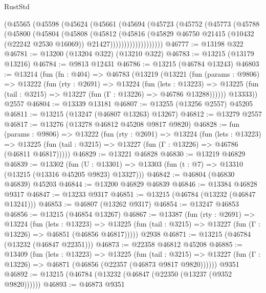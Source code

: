 \begin{lexlean}{RustStd}
\begin{coremodule}
            (@45565
              (@45598
                (@45624
                  (@45661
                    (@45694
                      (@45723
                        (@45752
                          (@45773
                            (@45788
                              (@45800
                                (@45804
                                  (@45808
                                    (@45812
                                      (@45816
                                        (@45829
                                          @46750
                                          @21415
                                          (@10432 (@22242 @2530 @16069))
                                          @21427)))))))))))))))))))
@46777 := @13198 @322
@46781 := @13200 (@13204 @322) (@13210 @322)
@46783 := @13215 (@13179 @13216)
@46784 := @9813 @12431
@46786 := @13215 (@46784 @13243)
@46803 := @13214
    (fun (fn : @404) =>
    @46783
      (@13219
        (@13221
          (fun (params : @9806) =>
          @13222
            (fun (rty : @2691) =>
            @13224
              (fun (lets : @13223) =>
              @13225 (fun (tail : @3215) => @13227 (fun (Γ : @13226) => @46786 @13288))))))
        @13333))
    @2557
@46804 := @13339 @13181
@46807 := @13255 (@13256 @2557) @45205
@46811 := @13215 (@13247 (@46807 @13263) @13267)
@46812 := @13279 @2557
@46817 := @13276 (@13278 @46812 @45208 @9817 @9820)
@46828 := fun (params : @9806) =>
  @13222
    (fun (rty : @2691) =>
    @13224
      (fun (lets : @13223) =>
      @13225 (fun (tail : @3215) => @13227 (fun (Γ : @13226) => @46786 (@46811 @46817)))))
@46829 := @13221 @46828
@46830 := @13219 @46829
@46839 := @13302
    (fun (U : @13301) => @13303 (fun (t : @7) => @13310 (@13215 (@13316 @45205 @9823) @13327)))
@46842 := @46804 (@46830 @46839) @45203
@46844 := @13200 @46829 @46839
@46846 := @13384 @46828 @9317
@46847 := @13233 @9317
@46851 := @13215 (@46784 (@13232 (@46847 @13241)))
@46853 := @46807 (@13262 @9317)
@46854 := @13247 @46853
@46856 := @13215 (@46854 @13267)
@46867 := @13387
    (fun (rty : @2691) =>
    @13224
      (fun (lets : @13223) =>
      @13225 (fun (tail : @3215) => @13227 (fun (Γ : @13226) => @46851 (@46856 @46817)))))
    @2938
@46871 := @13215 (@46784 (@13232 (@46847 @22351)))
@46873 := @22358 @46812 @45208
@46885 := @13409
    (fun (lets : @13223) =>
    @13225
      (fun (tail : @3215) =>
      @13227 (fun (Γ : @13226) => @46871 (@46856 (@22357 (@46873 @9817 @9820))))))
    @9351
@46892 := @13215 (@46784 (@13232 (@46847 (@22350 (@13237 (@9352 @9820))))))
@46893 := @46873 @9351

\end{coremodule}
\end{lexlean}
